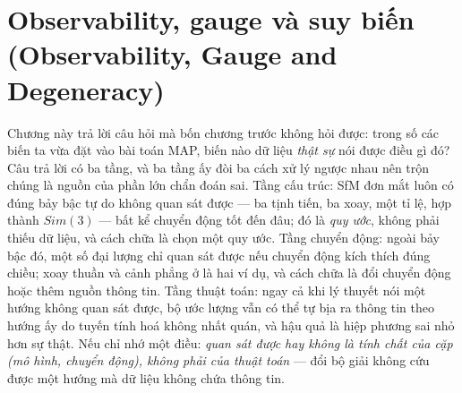 \documentclass[../../vslam.tex]{subfiles}
\begin{document}
\chapter{Observability, gauge và suy biến (Observability, Gauge and Degeneracy)}

\begin{tomtat}
Chương này trả lời câu hỏi mà bốn chương trước không hỏi được: trong số các biến ta vừa đặt vào bài toán MAP, biến nào dữ liệu \emph{thật sự} nói được điều gì đó? Câu trả lời có ba tầng, và ba tầng ấy đòi ba cách xử lý ngược nhau nên trộn chúng là nguồn của phần lớn chẩn đoán sai. Tầng cấu trúc: SfM đơn mắt luôn có đúng bảy bậc tự do không quan sát được --- ba tịnh tiến, ba xoay, một tỉ lệ, hợp thành \(Sim(3)\) --- bất kể chuyển động tốt đến đâu; đó là \emph{quy ước}, không phải thiếu dữ liệu, và cách chữa là chọn một quy ước. Tầng chuyển động: ngoài bảy bậc đó, một số đại lượng chỉ quan sát được nếu chuyển động kích thích đúng chiều; xoay thuần và cảnh phẳng ở  là hai ví dụ, và cách chữa là đổi chuyển động hoặc thêm nguồn thông tin. Tầng thuật toán: ngay cả khi lý thuyết nói một hướng không quan sát được, bộ ước lượng vẫn có thể tự bịa ra thông tin theo hướng ấy do tuyến tính hoá không nhất quán, và hậu quả là hiệp phương sai nhỏ hơn sự thật. Nếu chỉ nhớ một điều: \emph{quan sát được hay không là tính chất của cặp (mô hình, chuyển động), không phải của thuật toán} --- đổi bộ giải không cứu được một hướng mà dữ liệu không chứa thông tin.
\end{tomtat}
\end{document}
